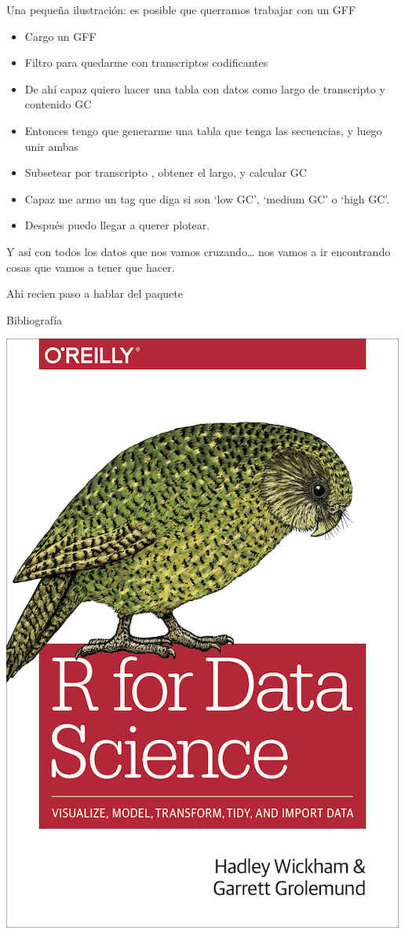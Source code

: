 \documentclass[ignorenonframetext,]{beamer}
\providecommand{\tightlist}{%
  \setlength{\itemsep}{0pt}\setlength{\parskip}{0pt}}
\begin{document}
\begin{frame}{Una pequeña ilustración: es posible que querramos trabajar
con un GFF}
\protect\hypertarget{una-pequeuxf1a-ilustraciuxf3n-es-posible-que-querramos-trabajar-con-un-gff}{}

\begin{itemize}
\tightlist
\item
  Cargo un GFF
\item
  Filtro para quedarme con transcriptos codificantes
\item
  De ahí capaz quiero hacer una tabla con datos como largo de
  transcripto y contenido GC
\item
  Entonces tengo que generarme una tabla que tenga las secuencias, y
  luego unir ambas
\item
  Subsetear por transcripto , obtener el largo, y calcular GC
\item
  Capaz me armo un tag que diga si son `low GC', `medium GC' o `high
  GC'.
\item
  Después puedo llegar a querer plotear.
\end{itemize}

Y así con todos los datos que nos vamos cruzando\ldots{} nos vamos a ir
encontrando cosas que vamos a tener que hacer.

\end{frame}

\begin{frame}{Ahi recien paso a hablar del paquete}
\protect\hypertarget{ahi-recien-paso-a-hablar-del-paquete}{}

\end{frame}

\begin{frame}{Bibliografía}
\protect\hypertarget{bibliografuxeda}{}

\begin{center}\includegraphics[width=0.45\linewidth]{cover_rfordatascience} \end{center}

\end{frame}
\end{document}

